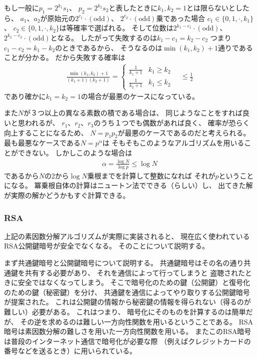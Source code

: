\documentclass[a4paper, 10pt]{jsarticle}
\begin{document}
もし一般に$p_1 = 2^{k_1} s_1$、
$p_2 = 2^{k_2} s_2$と表したときに$k_1, k_2 = 1$とは限らないとしたら、
$a_1$、$a_2$が原始元の$2^{c_1} \cdot (\mathrm{odd})$、
$2^{c_2} \cdot (\mathrm{odd})$乗であった場合
$c_1 \in \{0, 1, \cdot, k_1\}$、
$c_2 \in \{0, 1, \cdot, k_2\}$は等確率で選ばれる。
そして位数は$2^{k_1 - c_1} \cdot (\mathrm{odd})$、
$2^{k_2 - c_2} \cdot (\mathrm{odd})$となる。
したがって失敗するのは$k_1 - c_1 = k_2 - c_2$
つまり$c_1 - c_2 = k_1 - k_2$のときであるから、
そうなるのは$\min (k_1, k_2) + 1$通りであることが分かる。
だから失敗する確率は
\begin{align}
	\frac{\min (k_1, k_2) + 1}{(k_1 + 1) (k_2 + 1)}
	= \begin{cases}
		\displaystyle \frac{1}{k_1 + 1} & k_1 \geq k_2 \\
		\displaystyle \frac{1}{k_2 + 1} & k_1 \leq k_2
	\end{cases} \quad
	\leq \frac{1}{2}
\end{align}
であり確かに$k_1 = k_2 = 1$の場合が最悪のケースになっている。

また$N$が３つ以上の異なる素数の積である場合は、
同じようなことをすれば良いと思われるが、
$r_1$、$r_2$、$r_3$のうち１つでも偶数があれば良く、
確率が恐らく向上することになるため、
$N = p_1 p_2$が最悪のケースであるのだと考えられる。
最も最悪なケースである$N = p^\alpha$は
そもそもこのようなアルゴリズムを用いることができない。
しかしこのような場合は
\begin{align}
	\alpha = \frac{\log N}{\log p} \leq \log N
\end{align}
であるから$N$の2から$\log N$乗根までを計算して整数になれば
それが$p$ということになる。
冪乗根自体の計算はニュートン法でできる（らしい）し、
出てきた解が実際の解かどうかもすぐ計算できる。

\subsubsection{RSA}
上記の素因数分解アルゴリズムが実際に実装されると、
現在広く使われているRSA公開鍵暗号が安全でなくなる。
そのことについて説明する。

まず共通鍵暗号と公開鍵暗号について説明する。
共通鍵暗号はその名の通り共通鍵を共有する必要があり、
それを通信によって行ってしまうと
盗聴されたときに安全ではなくなってしまう。
そこで暗号化のための鍵（公開鍵）と復号化のための鍵（秘密鍵）を分け、
共通鍵を通信によってやり取りする公開鍵暗号が提案された。
これは公開鍵の情報から秘密鍵の情報を得られない（得るのが難しい）必要がある。
これはつまり、
暗号化にそのものを計算するのは簡単だが、
その逆を求めるのは難しい一方向性関数を用いるということである。
RSA暗号は素因数分解の難しさを用いた一方向性関数を用いる。
またこのRSA暗号は普段のインターネット通信で暗号化が必要な際
（例えばクレジットカードの番号などを送るとき）に用いられている。
\end{document}

